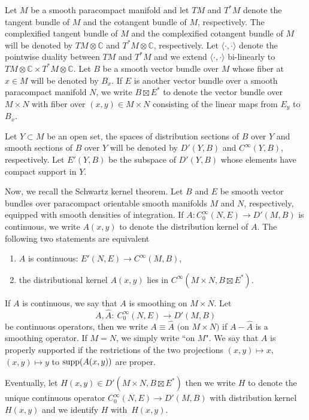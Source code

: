 \documentclass[pdftex]{sigma}
\numberwithin{equation}{section}
\newcommand{\To}{\rightarrow}
\begin{document}
	 Let $M$ be a smooth paracompact manifold and let $TM$ and $T^*M$ denote the tangent bundle of $M$
	 and the cotangent bundle of $M$, respectively.
	 The complexified tangent bundle of $M$ and the complexified cotangent bundle of $M$ will be denoted by $TM\otimes \mathbb{C}$
	 and $T^*M\otimes \mathbb{C}$, respectively. Let $\langle \cdot ,\cdot \rangle$ denote the pointwise
	 duality between $TM$ and $T^*M$ and we extend $\langle \cdot ,\cdot \rangle$ bi-linearly to~${ TM\otimes \mathbb{C}\times T^*M\otimes \mathbb{C}}$.
	 Let $B$ be a smooth vector bundle over $M$ whose fiber at $x\in M$ will be denoted by $B_x$.
	 If $E$ is another vector bundle over a smooth paracompact manifold $N$, we write
	 $B\boxtimes E^*$ to denote the vector bundle over $M\times N$ with fiber over $(x, y)\in M\times N$
	 consisting of the linear maps from $E_y$ to $B_x$.
	
	 Let $Y\subset M$ be an open set, the spaces of distribution sections of $B$ over $Y$ and smooth sections of $B$ over $Y$ will be denoted by $ D'(Y, B)$ and ${C}^\infty(Y, B)$, respectively.
	 Let $ E'(Y, B)$ be the subspace of $ D'(Y, B)$ whose elements have compact support in $Y$.
	
	
	 Now, we recall the Schwartz kernel theorem.
	 Let $B$ and $E$ be smooth vector
	 bundles over paracompact orientable smooth manifolds $M$ and $N$, respectively, equipped with smooth densities of integration. If
	$A\colon {C}^\infty_0(N, E)\To D'(M, B)$
	 is continuous, we write $A(x, y)$ to denote the distribution kernel of $A$.
	 The following two statements are equivalent
	 \begin{enumerate}\itemsep=0pt
	 	\item[(1)] $A$ is continuous: $ E'(N, E)\To{C}^\infty(M, B)$,
	 	\item[(2)] the distributional kernel $A(x,y)$ lies in ${C}^\infty(M\times N,B\boxtimes E^*)$.
	 \end{enumerate}
	 If $A$ is continuous, we say that $A$ is smoothing on $M \times N$. Let
	 \[A,\hat A\colon\ {C}^\infty_0(N, E)\To{D}'(M, B)\] be continuous operators, then we write
$
	 	\mbox{$A\equiv \hat A$ (on $M\times N$)}
$
	 if $A-\hat A$ is a smoothing operator. If $M=N$, we simply write ``on $M$".
	 We say that $A$ is properly supported if the restrictions of the two projections
	 $(x,y)\mapsto x$, $(x,y)\mapsto y$ to ${\rm supp }(A(x,y))$
	 are proper.
	
	 Eventually, let $H(x,y)\in D'(M\times N, B\boxtimes E^*) $
	 then we write $H$ to denote the unique
	 continuous operator $ C^\infty_0(N,E)\To D'(M,B)$ with distribution kernel $H(x,y)$ and we identify $H$ with~$H(x,y)$.
	
\end{document}
